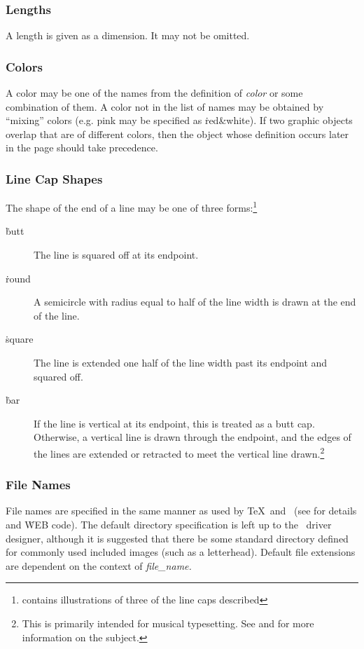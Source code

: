 \subsubsection{Lengths}
A length is given as a dimension. It may not be omitted.

\subsubsection{Colors}
A color may be one of the names from the definition of {\it color\/} or
some combination of them. A color not in the list of names may be
obtained by ``mixing'' colors (e.g. pink may be specified as
\.{red\&white}). If two graphic objects overlap that are of different
colors, then the object whose definition occurs later in the page should
take precedence.

\subsubsection{Line Cap Shapes}
The shape of the end of a line may be one of three forms:\footnote
{\cite[p.~217]{adobe:psref} contains illustrations of three of the line
caps described}
\begin{description}
\item[\.{butt}] The line is squared off at its endpoint.
\item[\.{round}] A semicircle with radius equal to half of the line width
         is drawn at the end of the line.
\item[\.{square}] The line is extended one half of the line width past
         its endpoint and squared off.
\item[\.{bar}] If the line is vertical at its endpoint, this is treated
         as a butt cap. Otherwise, a vertical line is drawn through the
         endpoint, and the edges of the lines are extended or retracted
         to meet the vertical line drawn.\footnote{This is primarily
         intended for musical typesetting. See \cite{gourlay:music} and
         \cite{renner:textyl} for more information on the subject.}
\end{description}

\subsubsection{File Names}\label{sec:filename}
File names are specified in the same manner as used by \TeX\ and \MF\
(see \cite[Part 29]{knuth:texprog} for details and \.{WEB} code).
The default directory specification is left up to the \DVI\ driver
designer, although it is suggested that there be some standard
directory defined for commonly used included images (such as a
letterhead). Default file extensions are dependent on the context
of {\it file\_name.\/}



